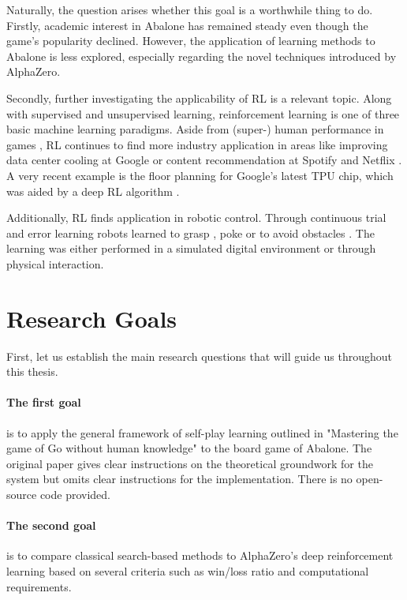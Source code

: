 Naturally, the question arises whether this goal is a worthwhile thing to do. Firstly, academic interest in Abalone has remained steady even though the game's popularity declined. However, the application of learning methods to Abalone is less explored, especially regarding the novel techniques introduced by AlphaZero.

Secondly, further investigating the applicability of RL is a relevant topic. Along with supervised and unsupervised learning, reinforcement learning is one of three basic machine learning paradigms. Aside from (super-) human performance in games \cite{mnih_human-level_2015, berner_dota_2019,vinyals_grandmaster_2019}, RL continues to find more industry application in areas like improving data center cooling at Google \cite{gamble_safety-first_2018} or content recommendation at Spotify \cite{jebara_for_2020} and Netflix \cite{siddiqi_ml_2019}. A very recent example is the floor planning for Google's latest TPU chip, which was aided by a deep RL algorithm \cite{mirhoseini_graph_2021}.

Additionally, RL finds application in robotic control. Through continuous trial and error learning robots learned to grasp \cite{pinto_supersizing_2016,zeng_learning_2018}, poke \cite{agrawal_learning_nodate} or to avoid obstacles \cite{kahn_uncertainty-aware_2017}. The learning was either performed in a simulated digital environment or through physical interaction.

\section{Research Goals}
First, let us establish the main research questions that will guide us throughout this thesis.

\paragraph{The first goal} is to apply the general framework of self-play learning outlined in "Mastering the game of Go without human knowledge" to the board game of Abalone. \cite{silver_mastering_2017} The original paper gives clear instructions on the theoretical groundwork for the system but omits clear instructions for the implementation. There is no open-source code provided.

\paragraph{The second goal} is to compare classical search-based methods to AlphaZero's deep reinforcement learning based on several criteria such as win/loss ratio and computational requirements.


